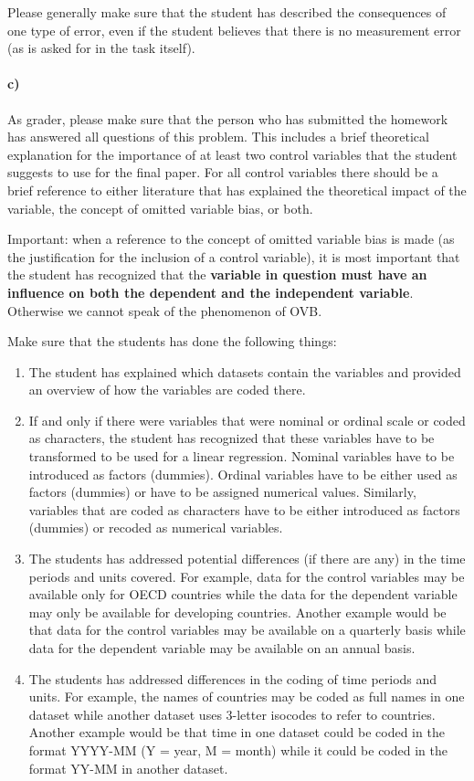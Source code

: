 \documentclass[12pt]{article}\usepackage[]{graphicx}\usepackage[]{color}
\begin{document}
Please generally make sure that the student has described the consequences of one type of error, even if the student believes that there is no measurement error (as is asked for in the task itself).

\paragraph*{c)} As grader, please make sure that the person who has submitted the homework has answered all questions of this problem. This includes a brief theoretical explanation for the importance of at least two control variables that the student suggests to use for the final paper. For all control variables there should be a brief reference to either literature that has explained the theoretical impact of the variable, the concept of omitted variable bias, or both.

Important: when a reference to the concept of omitted variable bias is made (as the justification for the inclusion of a control variable), it is most important that the student has recognized that the \textbf{variable in question must have an influence on both the dependent and the independent variable}. Otherwise we cannot speak of the phenomenon of OVB.

Make sure that the students has done the following things:

\begin{enumerate}
	\item The student has explained which datasets contain the variables and provided an overview of how the variables are coded there.
	\item If and only if there were variables that were nominal or ordinal scale or coded as characters, the student has recognized that these variables have to be transformed to be used for a linear regression. Nominal variables have to be introduced as factors (dummies). Ordinal variables have to be either used as factors (dummies) or have to be assigned numerical values. Similarly, variables that are coded as characters have to be either introduced as factors (dummies) or recoded as numerical variables.
	\item The students has addressed potential differences (if there are any) in the time periods and units covered. For example, data for the control variables may be available only for OECD countries while the data for the dependent variable may only be available for developing countries. Another example would be that data for the control variables may be available on a quarterly basis while data for the dependent variable may be available on an annual basis.
	\item The students has addressed differences in the coding of time periods and units. For example, the names of countries may be coded as full names in one dataset while another dataset uses 3-letter isocodes to refer to countries. Another example would be that time in one dataset could be coded in the format YYYY-MM (Y = year, M = month) while it could be coded in the format YY-MM in another dataset.
\end{enumerate}
\end{document}
